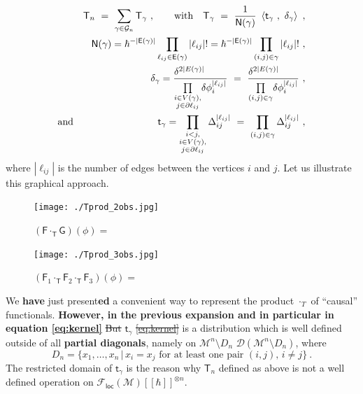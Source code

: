 \documentclass[11pt]{book}
\newcommand{\com}[1]{{\color{red}\bf #1}}
\newcommand{\sbar}[1]{\sout{\color{red} #1}}
\newcommand{\loc}{\mathsf{loc}}
\newcommand{\abs}[1]{\left|#1\right|}
\newcommand{\sm}[1]{\left\langle#1\right\rangle}
\newcommand{\Dcal}{\mathcal{D}}
\newcommand{\Gcal}{\mathcal{G}}
\newcommand{\Mcal}{\mathcal{M}}
\newcommand{\Esf}{\mathsf{E}}
\newcommand{\Fsf}{\mathsf{F}}
\newcommand{\Gsf}{\mathsf{G}}
\newcommand{\Nsf}{\mathsf{N}}
\newcommand{\Tsf}{\mathsf{T}}
\newcommand{\tsf}{\mathsf{t}}
\theoremstyle{break}
\begin{document}
\begin{eqnarray}
&& \Tsf_n \ = \ \sum_{\gamma \in \Gcal_n} \Tsf_\gamma \ , \qquad \mbox{with} \quad \Tsf_\gamma \ = \ \frac{1}{\Nsf(\gamma)} \ \sm{\tsf_\gamma \ , \ \delta_\gamma} \ ,
\label{eq:time_ordered_prod_graph} \\
%
&& \Nsf(\gamma) = \hbar^{-\abs{\Esf(\gamma)}} \prod_{\ell_{ij}\in\Esf(\gamma)} \abs{\ell_{ij}} ! = \hbar^{-\abs{\Esf(\gamma)}} \prod_{(i,j) \in \gamma} \abs{\ell_{ij}} ! \ , \nonumber \\
%
&& \delta_\gamma = \frac{\delta^{2\abs{E(\gamma)}}\hfill}{\underset{\substack{i \in V(\gamma), \\ j \in \partial \ell_{ij}}}{\prod} \delta \phi_i^{\abs{\ell_{ij}}}} \ = \ \frac{\delta^{2\abs{E(\gamma)}}\hfill}{\underset{(i,j)\in\gamma}{\prod} \delta \phi_i^{\abs{\ell_{ij}}}} \ , \nonumber \\
%
\mbox{and} &&\tsf_\gamma = \prod_{\substack{i < j, \\ i \in V(\gamma), \\ j \in \partial \ell_{ij}}} \Delta_{ij}^{\abs{\ell_{ij}}} \ = \ \prod_{(i,j)\in\gamma} \Delta_{ij}^{\abs{\ell_{ij}}} \ , 
%
\label{eq:kernel}
\end{eqnarray}
%
where $\abs{\ell_{ij}}$ is the number of edges between the vertices $i$ and $j$. Let us illustrate this graphical approach. 


\begin{figure}[ht!]
\centering
\texttt{[image: ./Tprod\_2obs.jpg]}
\caption{$(\Fsf \cdot_{\Tsf} \Gsf)(\phi) = $}
\end{figure}


\begin{figure}[ht!]
\centering
\texttt{[image: ./Tprod\_3obs.jpg]}
\caption{$(\Fsf_1 \cdot_{\Tsf} \Fsf_2 \cdot_{\Tsf} \Fsf_3)(\phi) =$}
\end{figure}



\bigskip







We \com{have} just present\com{ed} a convenient way to represent the product $\cdot_T$ of ``causal'' functionals. \com{However, in the previous expansion and in particular in equation \eqref{eq:kernel}} \sbar{But} $\tsf_\gamma$ \sbar{\eqref{eq:kernel}} is a distribution which is well defined outside of all \textbf{partial diagonals}, namely on \sbar{$\Mcal^n\setminus D_n$}  $\Dcal (\Mcal^n\setminus D_n)$, where 
%
\begin{equation}
D_n = \{x_1,\ldots,x_n\,|\, x_i=x_j \text{ for at least one pair } (i,j),\, i\neq j \} \ .
\label{eq:all_diagonals}
\end{equation}
%
The restricted domain of $\tsf_\gamma$ is the reason why $\Tsf_n$ defined as above is not a well defined operation on $\mathcal{F}_\loc(\Mcal)[[\hbar]]^{\otimes n}$. 
\end{document}
